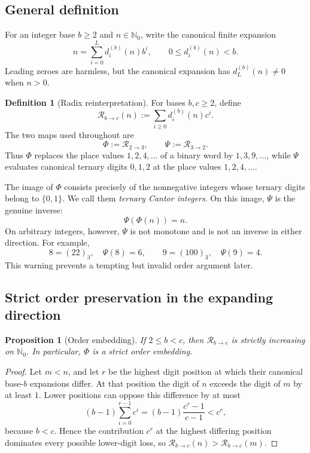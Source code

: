 \documentclass[11pt]{article}
\newtheorem{proposition}[theorem]{Proposition}
\theoremstyle{definition}
\newtheorem{definition}[theorem]{Definition}
\theoremstyle{remark}
\newcommand{\Nzero}{\mathbb N_0}
\newcommand{\PhiMap}{\Phi}
\newcommand{\PsiMap}{\Psi}
\newcommand{\Rad}{\mathcal R}
\begin{document}
\subsection{General definition}

For an integer base $b\ge2$ and $n\in\Nzero$, write the canonical finite
expansion
\[
  n=\sum_{i=0}^{L} d_i^{(b)}(n)b^i,
  \qquad 0\le d_i^{(b)}(n)<b.
\]
Leading zeroes are harmless, but the canonical expansion has
$d_L^{(b)}(n)\ne0$ when $n>0$.

\begin{definition}[Radix reinterpretation]
For bases $b,c\ge2$, define
\[
  \Rad_{b\to c}(n)
   :=\sum_{i\ge0}d_i^{(b)}(n)c^i.
\]
The two maps used throughout are
\[
  \PhiMap:=\Rad_{2\to3},\qquad
  \PsiMap:=\Rad_{3\to2}.
\]
Thus $\PhiMap$ replaces the place values $1,2,4,\ldots$ of a binary word by
$1,3,9,\ldots$, while $\PsiMap$ evaluates canonical ternary digits
$0,1,2$ at the place values $1,2,4,\ldots$.
\end{definition}

The image of $\PhiMap$ consists precisely of the nonnegative integers whose
ternary digits belong to $\{0,1\}$.  We call them \emph{ternary Cantor
integers}.  On this image, $\PsiMap$ is the genuine inverse:
\[
  \PsiMap(\PhiMap(n))=n.
\]
On arbitrary integers, however, $\PsiMap$ is not monotone and is not an
inverse in either direction.  For example,
\[
  8=(22)_3,\quad \PsiMap(8)=6,
  \qquad 9=(100)_3,\quad \PsiMap(9)=4.
\]
This warning prevents a tempting but invalid order argument later.

\subsection{Strict order preservation in the expanding direction}

\begin{proposition}[Order embedding]\label{prop:order}
If $2\le b<c$, then $\Rad_{b\to c}$ is strictly increasing on $\Nzero$.
In particular, $\PhiMap$ is a strict order embedding.
\end{proposition}

\begin{proof}
Let $m<n$, and let $r$ be the highest digit position at which their canonical
base-$b$ expansions differ.  At that position the digit of $n$ exceeds the
digit of $m$ by at least $1$.  Lower positions can oppose this difference by
at most
\[
  (b-1)\sum_{i=0}^{r-1}c^i
  =(b-1)\frac{c^r-1}{c-1}<c^r,
\]
because $b<c$.  Hence the contribution $c^r$ at the highest differing
position dominates every possible lower-digit loss, so
$\Rad_{b\to c}(n)>\Rad_{b\to c}(m)$.
\end{proof}
\end{document}
